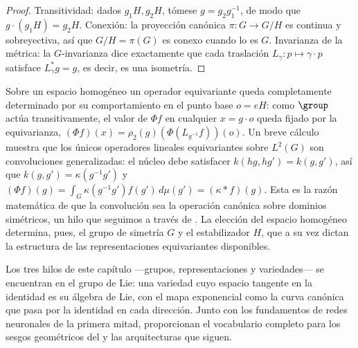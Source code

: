 \begin{proof}
Transitividad: dados $g_1 H, g_2 H$, t\'omese $g = g_2 g_1^{-1}$, de modo que
$g\cdot(g_1 H) = g_2 H$. Conexi\'on: la proyecci\'on can\'onica $\pi : G \to G/H$ es
continua y sobreyectiva, as\'i que $G/H = \pi(G)$ es conexo cuando lo es $G$.
Invarianza de la m\'etrica: la $G$-invarianza dice exactamente que cada traslaci\'on
$L_\gamma : p \mapsto \gamma\cdot p$ satisface $L_\gamma^* g = g$, es decir, es una
isometr\'ia.
\end{proof}

Sobre un espacio homog\'eneo un operador equivariante queda completamente
determinado por su comportamiento en el punto base $o = eH$: como $\group$ act\'ua
transitivamente, el valor de $\Phi f$ en cualquier $x = g\cdot o$ queda fijado por
la equivarianza, $(\Phi f)(x) = \rho_2(g)(\Phi(L_{g^{-1}}f))(o)$. Un breve c\'alculo
muestra que los \'unicos operadores lineales equivariantes sobre $L^2(G)$ son
convoluciones generalizadas: el n\'ucleo debe satisfacer $k(hg, hg') = k(g, g')$,
as\'i que $k(g,g') = \kappa(g^{-1}g')$ y $(\Phi f)(g) = \int_G
\kappa(g^{-1}g')f(g')\,d\mu(g') = (\kappa * f)(g)$. Esta es la raz\'on matem\'atica
de que la convoluci\'on sea la operaci\'on can\'onica sobre dominios sim\'etricos,
un hilo que seguimos a trav\'es de . La elecci\'on
del espacio homog\'eneo determina, pues, el grupo de simetr\'ia $G$ y el
estabilizador $H$, que a su vez dictan la estructura de las representaciones
equivariantes disponibles.

\medskip

Los tres hilos de este cap\'itulo ---grupos, representaciones y variedades--- se
encuentran en el grupo de Lie: una variedad cuyo espacio tangente en la identidad
es su \'algebra de Lie, con el mapa exponencial como la curva can\'onica que pasa
por la identidad en cada direcci\'on. Junto con los fundamentos de redes neuronales
de la primera mitad, proporcionan el vocabulario completo para los sesgos
geom\'etricos del  y las arquitecturas que siguen.
